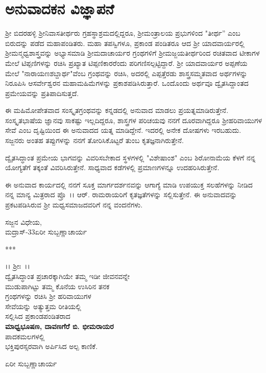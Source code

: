
\chapter*{ಅನುವಾದಕನ ವಿಜ್ಞಾಪನೆ}

 ಶ‍್ರೀ ಬಿದರಹಳ್ಳಿ ಶ‍್ರೀನಿವಾಸತೀರ್ಥರು ಗ್ರಹಸ್ಥಾಶ್ರಮದಲ್ಲಿದ್ದರೂ, ಶ‍್ರೀಮಂತ್ರಾಲಯ ಪ್ರಭು\-ಗಳಿಂದ "ತೀರ್ಥ'' ಎಂಬ ಬಿರುದನ್ನು ಪಡೆದ ಮಹಾಪಂಡಿತರು. ಮಹಾ ತಪಸ್ವಿ\-ಗಳೂ, ಪ್ರಕಾಂಡ ಪಂಡಿತರೂ ಆದ ಶ‍್ರೀ ಯಾದವಾರ್ಯರಲ್ಲಿ ಶ‍್ರೀಮನ್ಮಧ್ವಶಾಸ್ತ್ರವನ್ನು ಅಭ್ಯಾಸ\-ಮಾಡಿ ಶ‍್ರೀಮದಾಚಾರ್ಯರ ಗ್ರಂಥಗಳಿಗೆ ಶ‍್ರೀಮಜ್ಜಯತೀರ್ಥರಿಂದ ರಚಿತವಾದ ಟೀಕಾ\-ಗಳ ಮೇಲೆ ಟಿಪ್ಪಣಿಗಳನ್ನು ರಚಿಸಿ ಪ್ರಖ್ಯಾತ ಟಿಪ್ಪಣಿಕಾರರೆಂದು ಪರಿಗಣಿಸಲ್ಪಟ್ಟಿದ್ದಾರೆ. ಶ‍್ರೀ ಯಾದವಾರ್ಯರ ಅಪ್ಪಣೆಯ ಮೇಲೆ "ನಾರಾಯಣಶಬ್ದಾರ್ಥ"ವೆಂಬ ಗ್ರಂಥವನ್ನು ರಚಿಸಿ, ಅದರಲ್ಲಿ ಎಪ್ಪತ್ತೆರಡು ಶಾಸ್ತ್ರಸಮ್ಮತವಾದ ಅರ್ಥಗಳನ್ನು ನಿರೂಪಿಸಿ ಆ\break ಸರ್ವೇಶ್ವರನ ಮಹಾಮಹಿಮೆಗಳನ್ನು ಪ್ರಕಾಶಪಡಿಸಿರುತ್ತಾರೆ. ಒಂದೊಂದು ಅರ್ಥವೂ ದ್ವೈತ\-ಸಿದ್ದಾಂತದ ಪ್ರಮೇಯವನ್ನು ಪ್ರತಿಪಾದಿಸುತ್ತದೆ.

ಈ ಮಹಿಮೋಪೇತವಾದ ಸಂಸ್ಕೃತಗ್ರಂಥವನ್ನು ಕನ್ನಡದಲ್ಲಿ ಅನುವಾದ ಮಾಡಲು ಪ್ರಯತ್ನ\-ಮಾಡಿರುತ್ತೇನೆ. ಸಂಸ್ಕೃತಭಾಷೆಯ ಜ್ಞಾನವು ಸಾಕಷ್ಟು ಇಲ್ಲದಿದ್ದರೂ, ಶಾಸ್ತ್ರಗಳ ಪರಿ\-ಚಯವು ನನಗೆ ದೂರವಾಗಿದ್ದರೂ ಶ‍್ರೀಹರಿವಾಯುಗಳ ಸೇವೆ ಎಂಬ ದೃಷ್ಟಿಯಿಂದ ಈ ಅನುವಾದದ ಯತ್ನ ಮಾಡಿದ್ದೇನೆ. ಇದರಲ್ಲಿ ಅನೇಕ ದೋಷಗಳು ಇರಬಹುದು. ಸಜ್ಜನರು ಅಂತಹ ತಪ್ಪುಗಳನ್ನು ನನಗೆ ತೋರಿಸಿಕೊಟ್ಟರೆ ತುಂಬ ಕೃತಜ್ಞನಾಗಿರುತ್ತೇನೆ.

ದ್ವೈತಸಿದ್ಧಾಂತ ಪ್ರಮೇಯ ಭಾಗವನ್ನು ವಿವರಿಸಬೇಕಾದ ಸ್ಥಳಗಳಲ್ಲಿ "ವಿಶೇಷಾಂಶ" ಎಂಬ ಶಿರೋನಾಮೆಯ ಕೆಳಗೆ ನನ್ನ ಯೋಗ್ಯತೆಗೆ ತಕ್ಕಂತೆ ವಿವರಿಸಿರುತ್ತೇನೆ. ಸಾಧ್ಯವಾದ ಕಡೆ\-ಗಳಲ್ಲಿ ಪ್ರಮಾಣಗಳನ್ನೂ ಉದಹರಿಸಿರುತ್ತೇನೆ.

\newpage

ಈ ಅನುವಾದ ಕಾರ್ಯದಲ್ಲಿ ನನಗೆ ಸೂಕ್ತ ಮಾರ್ಗದರ್ಶನವನ್ನು ಆಗಾಗ್ಯೆ ಮಾಡಿ ಉಪಯುಕ್ತ ಸಲಹೆಗಳನ್ನು ನೀಡಿದ ನನ್ನ ಮಾನ್ಯ ಮಿತ್ರರಾದ ಪ್ರೊ~।। ಆರ್. ರಾಮರಾಯರಿಗೆ ಕೃತ\-ಜ್ಞತೆಗಳನ್ನು ಸಲ್ಲಿಸುತ್ತೇನೆ. ಈ ಅನುವಾದವನ್ನು ಪ್ರಕಟಪಡಿಸಿರುವ ಶ‍್ರೀ ಮಧ್ವಸಮಾಜ\-ದವರಿಗೆ ನನ್ನ ವಂದನೆಗಳು.

\vskip 1cm

\begin{flushleft}
\hfill ಸಜ್ಜನ ವಿಧೇಯ,\\ಮದ್ರಾಸ್-33\hfill ಏರೀ ಸುಬ್ಬಣ್ಣಾಚಾರ್ಯ
\end{flushleft}

\begin{center}
***
\end{center}

\newpage

\phantom{}

\vfill

\begin{center}
।। ಶ‍್ರೀಃ~।।\\ ದ್ವೈತಸಿದ್ಧಾಂತ ಪ್ರಚಾರಕ್ಕಾಗಿಯೇ ತಮ್ಮ ಇಡೀ ಜೀವನವನ್ನೇ\\ ಮುಡುಪಾಗಿಟ್ಟು ತಮ್ಮ ಕೊನೆಯ ಉಸಿರಿನ ತನಕ\\ ಗ್ರಂಥಗಳನ್ನು ರಚಿಸಿ ಶ‍್ರೀ ಹರಿವಾಯುಗಳ\\ ಸೇವೆಯನ್ನು ಅತ್ಯುತ್ತಮ ರೀತಿಯಲ್ಲಿ\\ ಸಲ್ಲಿಸಿದ ಪ್ರಕಾಂಡಪಂಡಿತರಾದ\\\textbf{ಮಾಧ್ವಭೂಷಣ, ದಾವಣಗೆರೆ ಬಿ. ಭೀಮರಾಯರ}\\ ಪಾದಕಮಲಗಳಲ್ಲಿ\\ ಭಕ್ತಿಪುರಸ್ಸರವಾಗಿ ಅರ್ಪಿಸಿದ ಅಲ್ಪ ಕಾಣಿಕೆ.
\end{center}

\begin{flushright}
ಏರೀ ಸುಬ್ಬಣ್ಣಾಚಾರ್ಯ
\end{flushright}

